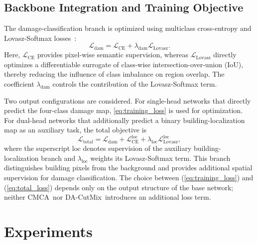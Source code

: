 \documentclass[journal]{IEEEtran}
\newcommand{\cmca}{CMCA}
\newcommand{\dacutmix}{DA-CutMix}
\begin{document}
    \subsection{Backbone Integration and Training Objective}
    \label{subsec:training}
    
    The damage-classification branch is optimized using multiclass cross-entropy and Lovasz-Softmax losses~\cite{berman2018lovasz}:
    \begin{equation}
        \mathcal{L}_{\mathrm{dam}}
        =
        \mathcal{L}_{\mathrm{CE}}
        +\lambda_{\mathrm{dam}}\mathcal{L}_{\mathrm{Lovasz}}.
        \label{eq:training_loss}
    \end{equation}
    Here, $\mathcal{L}_{\mathrm{CE}}$ provides pixel-wise semantic supervision, whereas $\mathcal{L}_{\mathrm{Lovasz}}$ directly optimizes a differentiable surrogate of class-wise intersection-over-union (IoU), thereby reducing the influence of class imbalance on region overlap. The coefficient $\lambda_{\mathrm{dam}}$ controls the contribution of the Lovasz-Softmax term.
    
    Two output configurations are considered. For single-head networks that directly predict the four-class damage map, \ref{eq:training_loss} is used for optimization. For dual-head networks that additionally predict a binary building-localization map as an auxiliary task, the total objective is
    \begin{equation}
        \mathcal{L}_{\mathrm{total}}
        =
        \mathcal{L}_{\mathrm{dam}}
        +\mathcal{L}^{\mathrm{loc}}_{\mathrm{CE}}
        +\lambda_{\mathrm{loc}}
        \mathcal{L}^{\mathrm{loc}}_{\mathrm{Lovasz}},
        \label{eq:total_loss}
    \end{equation}
    where the superscript $\mathrm{loc}$ denotes supervision of the auxiliary building-localization branch and $\lambda_{\mathrm{loc}}$ weights its Lovasz-Softmax term. This branch distinguishes building pixels from the background and provides additional spatial supervision for damage classification. The choice between (\ref{eq:training_loss}) and (\ref{eq:total_loss}) depends only on the output structure of the base network; neither \cmca\ nor \dacutmix\ introduces an additional loss term.
    
    
    \section{Experiments}
    \label{sec:experiments}
    
\end{document}
